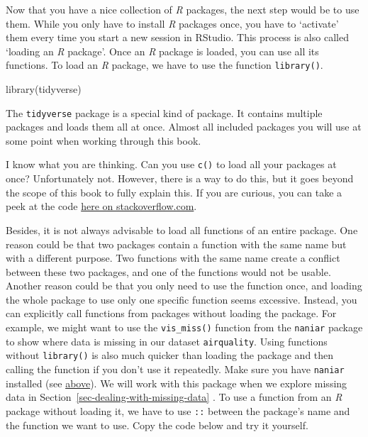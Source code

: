 \documentclass[
  letterpaper,
  DIV=11,
  numbers=noendperiod]{scrreprt}
\newenvironment{Shaded}{\begin{snugshade}}{\end{snugshade}}
\newcommand{\FunctionTok}[1]{\textcolor[rgb]{0.28,0.35,0.67}{#1}}
\newcommand{\NormalTok}[1]{\textcolor[rgb]{0.00,0.23,0.31}{#1}}
\begin{document}
Now that you have a nice collection of \emph{R} packages, the next step
would be to use them. While you only have to install \emph{R} packages
once, you have to `activate' them every time you start a new session in
RStudio. This process is also called `loading an \emph{R} package'. Once
an \emph{R} package is loaded, you can use all its functions. To load an
\emph{R} package, we have to use the function \texttt{library()}.

\begin{Shaded}
\begin{Highlighting}[]
\FunctionTok{library}\NormalTok{(tidyverse)}
\end{Highlighting}
\end{Shaded}

The \texttt{tidyverse} package is a special kind of package. It contains
multiple packages and loads them all at once. Almost all included
packages you will use at some point when working through this book.

I know what you are thinking. Can you use \texttt{c()} to load all your
packages at once? Unfortunately not. However, there is a way to do this,
but it goes beyond the scope of this book to fully explain this. If you
are curious, you can take a peek at the code
\href{https://stackoverflow.com/questions/8175912/load-multiple-packages-at-once}{here
on stackoverflow.com}.

Besides, it is not always advisable to load all functions of an entire
package. One reason could be that two packages contain a function with
the same name but with a different purpose. Two functions with the same
name create a conflict between these two packages, and one of the
functions would not be usable. Another reason could be that you only
need to use the function once, and loading the whole package to use only
one specific function seems excessive. Instead, you can explicitly call
functions from packages without loading the package. For example, we
might want to use the \texttt{vis\_miss()} function from the
\texttt{naniar} package to show where data is missing in our dataset
\texttt{airquality}. Using functions without \texttt{library()} is also
much quicker than loading the package and then calling the function if
you don't use it repeatedly. Make sure you have \texttt{naniar}
installed (see
\hyperref[install-packages-tidyverse-nanair-psych]{above}). We will work
with this package when we explore missing data in
Section~\ref{sec-dealing-with-missing-data} . To use a function from an
\emph{R} package without loading it, we have to use \texttt{::} between
the package's name and the function we want to use. Copy the code below
and try it yourself.
\end{document}
